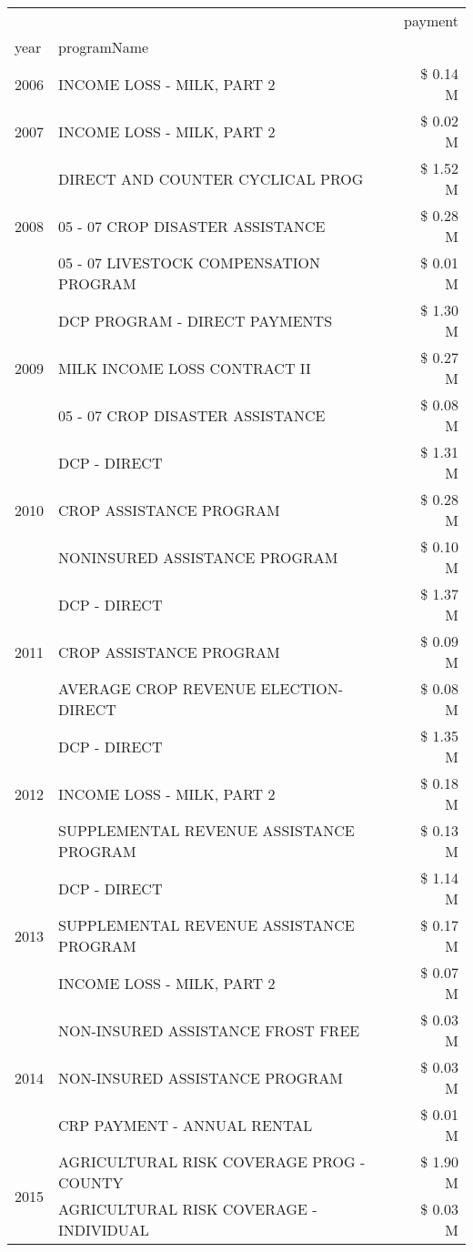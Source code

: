 \begin{tabular}{llr}
\toprule
 &  & payment \\
year & programName &  \\
\midrule
2006 & INCOME LOSS - MILK, PART 2 & \$ 0.14 M \\
\cline{1-3}
2007 & INCOME LOSS - MILK, PART 2 & \$ 0.02 M \\
\cline{1-3}
\multirow[t]{3}{*}{2008} & DIRECT AND COUNTER CYCLICAL PROG & \$ 1.52 M \\
 & 05 - 07 CROP DISASTER ASSISTANCE & \$ 0.28 M \\
 & 05 - 07 LIVESTOCK COMPENSATION PROGRAM & \$ 0.01 M \\
\cline{1-3}
\multirow[t]{3}{*}{2009} & DCP PROGRAM - DIRECT PAYMENTS & \$ 1.30 M \\
 & MILK INCOME LOSS CONTRACT II & \$ 0.27 M \\
 & 05 - 07 CROP DISASTER ASSISTANCE & \$ 0.08 M \\
\cline{1-3}
\multirow[t]{3}{*}{2010} & DCP - DIRECT & \$ 1.31 M \\
 & CROP ASSISTANCE PROGRAM & \$ 0.28 M \\
 & NONINSURED ASSISTANCE PROGRAM & \$ 0.10 M \\
\cline{1-3}
\multirow[t]{3}{*}{2011} & DCP - DIRECT & \$ 1.37 M \\
 & CROP ASSISTANCE PROGRAM & \$ 0.09 M \\
 & AVERAGE CROP REVENUE ELECTION-DIRECT & \$ 0.08 M \\
\cline{1-3}
\multirow[t]{3}{*}{2012} & DCP - DIRECT & \$ 1.35 M \\
 & INCOME LOSS - MILK, PART 2 & \$ 0.18 M \\
 & SUPPLEMENTAL REVENUE ASSISTANCE PROGRAM & \$ 0.13 M \\
\cline{1-3}
\multirow[t]{3}{*}{2013} & DCP - DIRECT & \$ 1.14 M \\
 & SUPPLEMENTAL REVENUE ASSISTANCE PROGRAM & \$ 0.17 M \\
 & INCOME LOSS - MILK, PART 2 & \$ 0.07 M \\
\cline{1-3}
\multirow[t]{3}{*}{2014} & NON-INSURED ASSISTANCE FROST FREE & \$ 0.03 M \\
 & NON-INSURED ASSISTANCE PROGRAM & \$ 0.03 M \\
 & CRP PAYMENT - ANNUAL RENTAL & \$ 0.01 M \\
\cline{1-3}
\multirow[t]{3}{*}{2015} & AGRICULTURAL RISK COVERAGE PROG - COUNTY & \$ 1.90 M \\
 & AGRICULTURAL RISK COVERAGE - INDIVIDUAL & \$ 0.03 M \\

\end{tabular}
